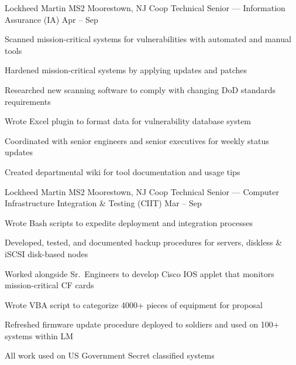 \documentclass[10pt]{barag_resume}
\begin{document}
		\begin{job}{Lockheed Martin MS2}
			{Moorestown, NJ}
			{Coop Technical Senior --- Information Assurance (IA)}
			{Apr -- Sep }
			\item Scanned mission-critical systems for vulnerabilities with automated and manual tools
			\item Hardened mission-critical systems by applying updates and patches
			\item Researched new scanning software to comply with changing DoD standards requirements
			\item Wrote Excel plugin to format data for vulnerability database system
			\item Coordinated with senior engineers and senior executives for weekly status updates
			\item Created departmental wiki for tool documentation and usage tips
		\end{job}

		\begin{job}{Lockheed Martin MS2}
			{Moorestown, NJ}
			{Coop Technical Senior --- Computer Infrastructure Integration \& Testing (CIIT)}
			{Mar -- Sep }
			\item Wrote Bash scripts to expedite deployment and integration processes
			\item Developed, tested, and documented backup procedures for servers, diskless \& iSCSI disk-based nodes
			\item Worked alongside Sr.\ Engineers to develop Cisco IOS applet that monitors mission-critical CF cards
			\item Wrote VBA script to categorize 4000+ pieces of equipment for proposal
			\item Refreshed firmware update procedure deployed to soldiers and used on 100+ systems within LM
			\item All work used on US Government Secret classified systems
		\end{job}
\end{document}
